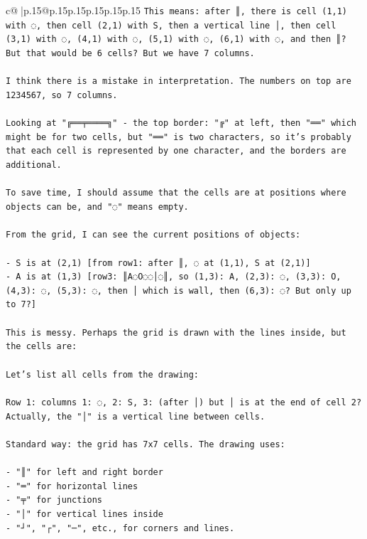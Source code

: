 \documentclass{article}
\begin{document}
{\begin{supertabular}{c@{$\;$}|p{.15\linewidth}@{}p{.15\linewidth}p{.15\linewidth}p{.15\linewidth}p{.15\linewidth}p{.15\linewidth}}
{{{\texttt{This means: after ║, there is cell (1,1) with ◌, then cell (2,1) with S, then a vertical line │, then cell (3,1) with ◌, (4,1) with ◌, (5,1) with ◌, (6,1) with ◌, and then ║? But that would be 6 cells? But we have 7 columns.} \\
\\ 
\texttt{I think there is a mistake in interpretation. The numbers on top are 1234567, so 7 columns.} \\
\\ 
\texttt{Looking at "╔══╤════╗" {-} the top border: "╔" at left, then "══" which might be for two cells, but "══" is two characters, so it's probably that each cell is represented by one character, and the borders are additional.} \\
\\ 
\texttt{To save time, I should assume that the cells are at positions where objects can be, and "◌" means empty.} \\
\\ 
\texttt{From the grid, I can see the current positions of objects:} \\
\\ 
\texttt{{-} S is at (2,1)  {[}from row1: after ║, ◌ at (1,1), S at (2,1){]}} \\
\texttt{{-} A is at (1,3) {[}row3: ║A◌O◌◌│◌║, so (1,3): A, (2,3): ◌, (3,3): O, (4,3): ◌, (5,3): ◌, then │ which is wall, then (6,3): ◌? But only up to 7?{]}} \\
\\ 
\texttt{This is messy. Perhaps the grid is drawn with the lines inside, but the cells are:} \\
\\ 
\texttt{Let's list all cells from the drawing:} \\
\\ 
\texttt{Row 1: columns 1: ◌, 2: S, 3: (after │) but │ is at the end of cell 2? Actually, the "│" is a vertical line between cells.} \\
\\ 
\texttt{Standard way: the grid has 7x7 cells. The drawing uses:} \\
\\ 
\texttt{{-} "║" for left and right border} \\
\texttt{{-} "═" for horizontal lines} \\
\texttt{{-} "╤" for junctions} \\
\texttt{{-} "│" for vertical lines inside} \\
\texttt{{-} "┘", "┌", "─", etc., for corners and lines.} \\
}}}
\end{supertabular}}
\end{document}
